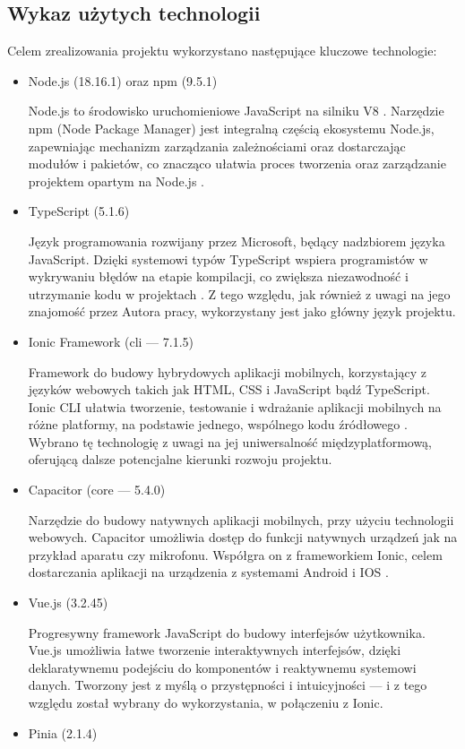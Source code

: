 \subsection{Wykaz użytych technologii}
Celem zrealizowania projektu wykorzystano następujące kluczowe technologie:
\begin{itemize}
	\item Node.js (18.16.1) oraz npm (9.5.1)

	      Node.js to środowisko uruchomieniowe JavaScript na silniku V8 \cite{node}.
	      Narzędzie npm (Node Package Manager) jest integralną częścią ekosystemu Node.js,
	      zapewniając mechanizm zarządzania zależnościami oraz dostarczając modułów i pakietów,
	      co znacząco ułatwia proces tworzenia oraz zarządzanie projektem opartym na Node.js \cite{npm}.
	\item TypeScript (5.1.6)

	      Język programowania rozwijany przez Microsoft, będący nadzbiorem języka JavaScript.
	      Dzięki systemowi typów TypeScript wspiera programistów w wykrywaniu błędów na etapie kompilacji,
	      co zwiększa niezawodność i utrzymanie kodu w projektach \cite{ts}.
	      Z tego względu, jak również z uwagi na jego znajomość
	      przez Autora pracy, wykorzystany jest jako główny język projektu.
	\item Ionic Framework (cli — 7.1.5)

	      Framework do budowy hybrydowych aplikacji mobilnych, korzystający z języków webowych takich jak HTML,
	      CSS i JavaScript bądź TypeScript.
	      Ionic CLI ułatwia tworzenie, testowanie i wdrażanie aplikacji mobilnych na różne platformy, na podstawie jednego,
	      wspólnego kodu źródłowego \cite{ionic}.
	      Wybrano tę technologię z uwagi na jej uniwersalność międzyplatformową, oferującą dalsze potencjalne kierunki
	      rozwoju projektu.
	\item Capacitor (core — 5.4.0)

	      Narzędzie do budowy natywnych aplikacji mobilnych, przy użyciu technologii webowych.
	      Capacitor umożliwia dostęp do funkcji natywnych urządzeń jak na przykład aparatu czy mikrofonu.
	      Współgra on z frameworkiem Ionic, celem dostarczania aplikacji na urządzenia z systemami Android i IOS \cite{capacitor}.
	\item Vue.js (3.2.45)

	      Progresywny framework JavaScript do budowy interfejsów użytkownika.
	      Vue.js umożliwia łatwe tworzenie interaktywnych interfejsów, dzięki deklaratywnemu podejściu do komponentów i
	      reaktywnemu systemowi danych. Tworzony jest z myślą o przystępności i intuicyjności \cite{vue}
	      — i z tego względu został wybrany do wykorzystania, w połączeniu z Ionic.
	\item Pinia (2.1.4)


\end{itemize}
